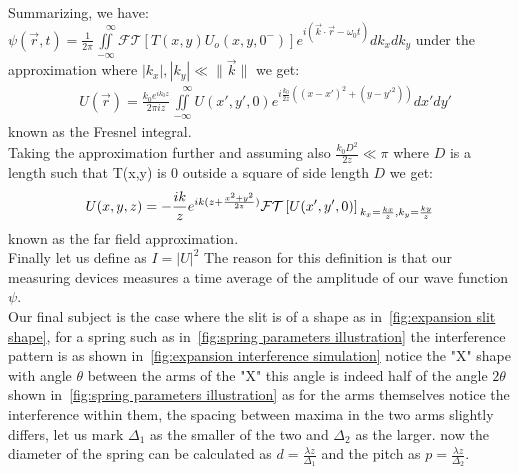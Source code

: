 \\Summarizing, we have:\\
$\psi(\vec{r},t)=\frac{1}{2\pi} \iint\limits_{-\infty}^{\quad \infty}\mathcal{FT}\left[ T(x,y)U_o(x,y,0^-) \right]e^{i \left( \vec{k}\cdot\vec{r}-\omega_0 t \right)}dk_x dk_y$
under the approximation where $|k_x|,|k_y| \ll \|\vec{k}\|$ we get:
\begin{align} \label{eq:nearfield}
    &U(\vec{r})=\frac{k_0 e^{ik_0 z}}{2\pi iz}\iint\limits_{-\infty}^{\quad \infty}U(x',y',0)e^{i\frac{k_0}{2z}((x-x')^2+(y-y'^2))}dx' dy'
\end{align}
known as the Fresnel integral\cite{fresnel}.\\
Taking the approximation further and assuming also $\frac{k_0 D^2}{2z} \ll \pi$ where $D$ is a length such that T(x,y) is 0 outside a square of side length $D$
we get:
\begin{equation}\label{eq:farfield}
    U(x,y,z)=-\frac{ik}{z}e^{ik(z+\frac{x^2+y^2}{2z})}\mathcal{FT}\left[ U(x',y',0) \right]\\
    _{k_x=\frac{kx}{z},k_y=\frac{ky}{z}}
\end{equation}
known as the far field approximation.\\
Finally let us define as $I=|U|^2$ The reason for this definition is that our measuring devices measures a time average of the amplitude of our wave function $\psi$.\\
Our final subject is the case where the slit is of a shape as in~\ref{fig:expansion slit shape}, for a spring such as in~\ref{fig:spring parameters illustration}
the interference pattern is as shown in~\ref{fig:expansion interference simulation} notice the "X" shape with angle $\theta$ between the arms of the "X"
this angle is indeed half of the angle $2\theta$ shown in~\ref{fig:spring parameters illustration}
as for the arms themselves notice the interference within them, the spacing between maxima in the two arms slightly differs,
let us mark $\Delta_1$ as the smaller of the two and $\Delta_2$ as the larger.
now the diameter of the spring can be calculated as
$d=\frac{\lambda z}{\Delta_1}$ and the pitch as $p=\frac{\lambda z}{\Delta_2}$.\\
